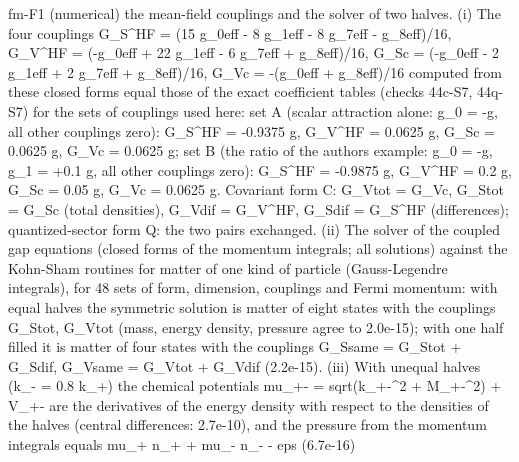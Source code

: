 \documentclass[
  10pt,
]{article}
\newenvironment{Shaded}{}{}
\newcommand{\NormalTok}[1]{#1}
\begin{document}
\begin{Shaded}
\begin{Highlighting}[]
\NormalTok{[PASS] fm{-}F1  (numerical) the mean{-}field couplings and the solver of two halves. (i) The four couplings G\_S\^{}HF = (15 g\_0eff {-} 8 g\_1eff {-} 8 g\_7eff {-} g\_8eff)/16, G\_V\^{}HF = ({-}g\_0eff + 22 g\_1eff {-} 6 g\_7eff + g\_8eff)/16, G\_Sc = ({-}g\_0eff {-} 2 g\_1eff + 2 g\_7eff + g\_8eff)/16, G\_Vc = {-}(g\_0eff + g\_8eff)/16 computed from these closed forms equal those of the exact coefficient tables (checks 44c{-}S7, 44q{-}S7) for the sets of couplings used here: set A (scalar attraction alone: g\_0 = {-}g, all other couplings zero): G\_S\^{}HF = {-}0.9375 g, G\_V\^{}HF = 0.0625 g, G\_Sc = 0.0625 g, G\_Vc = 0.0625 g; set B (the ratio of the author\textquotesingle{}s example: g\_0 = {-}g, g\_1 = +0.1 g, all other couplings zero): G\_S\^{}HF = {-}0.9875 g, G\_V\^{}HF = 0.2 g, G\_Sc = 0.05 g, G\_Vc = 0.0625 g. Covariant form C: G\_Vtot = G\_Vc, G\_Stot = G\_Sc (total densities), G\_Vdif = G\_V\^{}HF, G\_Sdif = G\_S\^{}HF (differences); quantized{-}sector form Q: the two pairs exchanged. (ii) The solver of the coupled gap equations (closed forms of the momentum integrals; all solutions) against the Kohn{-}Sham routines for matter of one kind of particle (Gauss{-}Legendre integrals), for 48 sets of form, dimension, couplings and Fermi momentum: with equal halves the symmetric solution is matter of eight states with the couplings G\_Stot, G\_Vtot (mass, energy density, pressure agree to 2.0e{-}15); with one half filled it is matter of four states with the couplings G\_Ssame = G\_Stot + G\_Sdif, G\_Vsame = G\_Vtot + G\_Vdif (2.2e{-}15). (iii) With unequal halves (k\_{-} = 0.8 k\_+) the chemical potentials mu\_+{-} = sqrt(k\_+{-}\^{}2 + M\_+{-}\^{}2) + V\_+{-} are the derivatives of the energy density with respect to the densities of the halves (central differences: 2.7e{-}10), and the pressure from the momentum integrals equals mu\_+ n\_+ + mu\_{-} n\_{-} {-} eps (6.7e{-}16)}

\end{Highlighting}
\end{Shaded}
\end{document}
